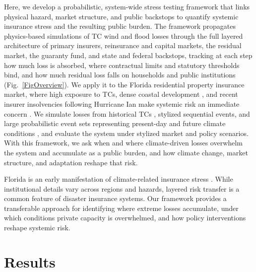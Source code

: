 \documentclass[fleqn,10pt]{wlscirep}
\begin{document}
Here, we develop a probabilistic, system-wide stress testing framework that links physical hazard, market structure, and public backstops to quantify systemic insurance stress and the resulting public burden. The framework propagates physics-based simulations of TC wind and flood losses through the full layered architecture of primary insurers, reinsurance and capital markets, the residual market, the guaranty fund, and state and federal backstops, tracking at each step how much loss is absorbed, where contractual limits and statutory thresholds bind, and how much residual loss falls on households and public institutions (Fig.~\ref{FigOverview}). We apply it to the Florida residential property insurance market, where high exposure to TCs, dense coastal development \cite{abrahams_climate_2025}, and recent insurer insolvencies following Hurricane Ian \cite{sastry_when_2023} make systemic risk an immediate concern \cite{kousky_insurance_2024}. We simulate losses from historical TCs \cite{knapp_international_2010}, stylized sequential events, and large probabilistic event sets representing present-day and future climate conditions \cite{emanuel_statistical_2006, emanuel_hurricanes_2008}, and evaluate the system under stylized market and policy scenarios. With this framework, we ask when and where climate-driven losses overwhelm the system and accumulate as a public burden, and how climate change, market structure, and adaptation reshape that risk.\medskip

Florida is an early manifestation of climate-related insurance stress  \cite{kousky_insurance_2024}. While institutional details vary across regions and hazards, layered risk transfer is a common feature of disaster insurance systems. Our framework provides a transferable approach for identifying where extreme losses accumulate, under which conditions private capacity is overwhelmed, and how policy interventions reshape systemic risk.



\section{Results}
\end{document}
